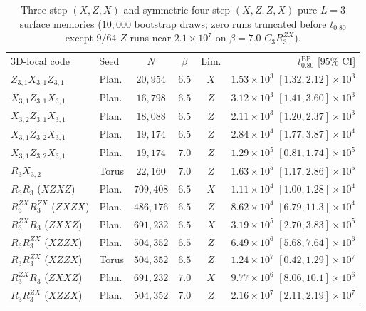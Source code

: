 \documentclass[aps,prx,reprint,superscriptaddress,nofootinbib,floatfix]{revtex4-2}
\begin{document}
\begin{table}[!htbp]
\caption{Three-step $(X, Z, X)$ and symmetric four-step $(X, Z, Z, X)$ pure-$L = 3$ surface memories ($10{,}000$ bootstrap draws; zero runs truncated before $t_{0.80}$ except $9/64$ $Z$ runs near $2.1 \times 10^7$ on $\beta = 7.0$ $C_3 R_3^{ZX}$).}
\label{tab:rebalance}
{\scriptsize
\setlength{\tabcolsep}{1.0pt}
\begin{ruledtabular}
\begin{tabular}{llcccr}
3D-local code & Seed & $N$ & $\beta$ & Lim. & $t_{0.80}^{\mathrm{BP}}$ [$95\%$ CI] \\
\colrule
$Z_{3,1} X_{3,1} Z_{3,1}$ & Plan. & $20{,}954$ & $6.5$ & $X$ & $1.53{\times}10^3$ $[1.32, 2.12]{\times}10^3$ \\
$X_{3,1} Z_{3,1} X_{3,1}$ & Plan. & $16{,}798$ & $6.5$ & $Z$ & $3.12{\times}10^3$ $[1.41, 3.60]{\times}10^3$ \\
$X_{3,2} Z_{3,1} X_{3,1}$ & Plan. & $18{,}088$ & $6.5$ & $Z$ & $2.11{\times}10^3$ $[1.20, 2.37]{\times}10^3$ \\
$X_{3,1} Z_{3,2} X_{3,1}$ & Plan. & $19{,}174$ & $6.5$ & $Z$ & $2.84{\times}10^4$ $[1.77, 3.87]{\times}10^4$ \\
$X_{3,1} Z_{3,2} X_{3,1}$ & Plan. & $19{,}174$ & $7.0$ & $Z$ & $1.29{\times}10^5$ $[0.81, 1.74]{\times}10^5$ \\
$R_3 X_{3,2}$ & Torus & $22{,}160$ & $7.0$ & $Z$ & $1.63{\times}10^5$ $[1.17, 2.86]{\times}10^5$ \\
\colrule
$R_3 R_3$ ($XZXZ$) & Plan. & $709{,}408$ & $6.5$ & $X$ & $1.11{\times}10^4$ $[1.00, 1.28]{\times}10^4$ \\
$R_3^{ZX} R_3^{ZX}$ ($ZXZX$) & Plan. & $486{,}176$ & $6.5$ & $Z$ & $8.62{\times}10^4$ $[6.79, 11.3]{\times}10^4$ \\
$R_3^{ZX} R_3$ ($ZXXZ$) & Plan. & $691{,}232$ & $6.5$ & $X$ & $3.19{\times}10^5$ $[2.70, 3.83]{\times}10^5$ \\
$R_3 R_3^{ZX}$ ($XZZX$) & Plan. & $504{,}352$ & $6.5$ & $Z$ & $6.49{\times}10^6$ $[5.68, 7.64]{\times}10^6$ \\
$R_3 R_3^{ZX}$ ($XZZX$) & Torus & $504{,}352$ & $6.5$ & $Z$ & $1.24{\times}10^7$ $[0.42, 1.29]{\times}10^7$ \\
$R_3^{ZX} R_3$ ($ZXXZ$) & Plan. & $691{,}232$ & $7.0$ & $X$ & $9.77{\times}10^6$ $[8.06, 10.1]{\times}10^6$ \\
$R_3 R_3^{ZX}$ ($XZZX$) & Plan. & $504{,}352$ & $7.0$ & $Z$ & $2.16{\times}10^7$ $[2.11, 2.19]{\times}10^7$ \\

\end{tabular}
\end{ruledtabular}}
\end{table}
\end{document}
